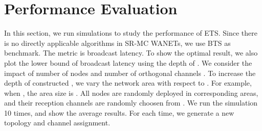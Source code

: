 \documentclass[10pt, conference]{IEEEtran}
\begin{document}
\iffalse
\begin{figure*}
\centering
\texttt{[image: 1.pdf]}\hspace{1in}\texttt{[image: 2.pdf]}
\caption{Two Graphics in One Figure}
\end{figure*}

\begin{figure*}
\centering
\texttt{[image: 3.pdf]}\hspace{1in}\texttt{[image: 4.pdf]}
\caption{Two Graphics in One Figure}
\end{figure*}

\begin{figure*}[!ht]
\begin{minipage}[]{0.33\textwidth}
\centering\texttt{[image: 1.pdf]}
\caption{\textrm{Impact of  when }}\label{n}
\end{minipage}
\begin{minipage}[]{0.33\textwidth}
\centering\texttt{[image: 2.pdf]}
\caption{\textrm{Impact of  when }}\label{k}
\end{minipage}
\begin{minipage}[]{0.33\textwidth}
\centering\texttt{[image: 3.pdf]} \caption{\textrm{Variance of Running Times}}\label{var}
\end{minipage}
\end{figure*}
\fi

\section{Performance Evaluation} \label{eval}
In this section, we run simulations to study the performance of
ETS. Since there is no directly applicable algorithms in SR-MC
WANETs, we use BTS as benchmark. The metric is broadcast
latency. To show the optimal result, we also plot the lower
bound of broadcast latency using the depth of . We
consider the impact of number of nodes  and number of
orthogonal channels . To increase the depth of constructed
, we vary the network area with respect to . For
example, when , the area size is 
. All nodes are randomly deployed in corresponding areas,
and their reception channels are randomly choosen from . We
run the simulation 10 times, and show the average results. For
each time, we generate a new topology and channel assignment.
\end{document}
